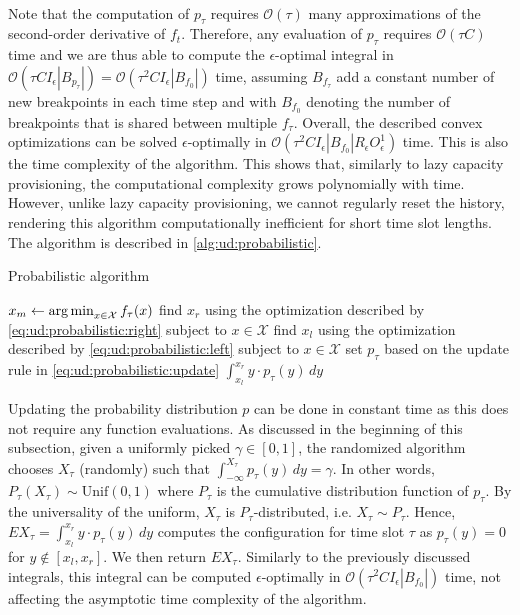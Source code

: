 \paragraph{} Note that the computation of $p_{\tau}$ requires $\mathcal{O}(\tau)$ many approximations of the second-order derivative of $f_{t}$. Therefore, any evaluation of $p_{\tau}$ requires $\mathcal{O}(\tau C)$ time and we are thus able to compute the $\epsilon$-optimal integral in $\mathcal{O}(\tau C I_{\epsilon} |B_{p_{\tau}}|) = \mathcal{O}(\tau^2 C I_{\epsilon} |B_{f_0}|)$ time, assuming $B_{f_{\tau}}$ add a constant number of new breakpoints in each time step and with $B_{f_0}$ denoting the number of breakpoints that is shared between multiple $f_{\tau}$. Overall, the described convex optimizations can be solved $\epsilon$-optimally in $\mathcal{O}(\tau^2 C I_{\epsilon} |B_{f_0}| R_{\epsilon} O_{\epsilon}^1)$ time. This is also the time complexity of the algorithm. This shows that, similarly to lazy capacity provisioning, the computational complexity grows polynomially with time. However, unlike lazy capacity provisioning, we cannot regularly reset the history, rendering this algorithm computationally inefficient for short time slot lengths. The algorithm is described in \cref{alg:ud:probabilistic}.

\begin{algorithm}
    \caption{Probabilistic algorithm~\cite{Bansal2015}}\label{alg:ud:probabilistic}
    $x_m \gets \operatorname*{arg\,min}_{x \in \mathcal{X}} f_{\tau}(x)$\;
    find $x_r$ using the optimization described by \cref{eq:ud:probabilistic:right} subject to $x \in \mathcal{X}$\;
    find $x_l$ using the optimization described by \cref{eq:ud:probabilistic:left} subject to $x \in \mathcal{X}$\;
    set $p_{\tau}$ based on the update rule in \cref{eq:ud:probabilistic:update}\;
    \Return $\int_{x_l}^{x_r} y \cdot p_{\tau}(y) \,dy$\;
\end{algorithm}

Updating the probability distribution $p$ can be done in constant time as this does not require any function evaluations. As discussed in the beginning of this subsection, given a uniformly picked $\gamma \in [0,1]$, the randomized algorithm chooses $X_{\tau}$ (randomly) such that $\int_{-\infty}^{X_{\tau}} p_{\tau}(y) \,dy = \gamma$. In other words, $P_{\tau}(X_{\tau}) \sim \text{Unif}(0,1)$ where $P_{\tau}$ is the cumulative distribution function of $p_{\tau}$. By the universality of the uniform, $X_{\tau}$ is $P_{\tau}$-distributed, i.e. $X_{\tau} \sim P_{\tau}$. Hence, $E X_{\tau} = \int_{x_l}^{x_r} y \cdot p_{\tau}(y) \,dy$ computes the configuration for time slot $\tau$ as $p_{\tau}(y) = 0$ for $y \not\in [x_l, x_r]$. We then return $E X_{\tau}$. Similarly to the previously discussed integrals, this integral can be computed $\epsilon$-optimally in $\mathcal{O}(\tau^2 C I_{\epsilon} |B_{f_0}|)$ time, not affecting the asymptotic time complexity of the algorithm.

